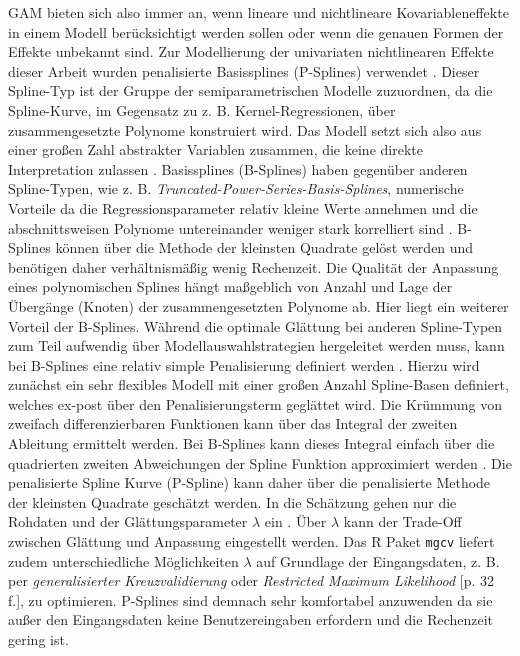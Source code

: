 \documentclass{Vorlage}
\begin{document}
GAM bieten sich also immer an, wenn lineare und nichtlineare Kovariableneffekte in einem Modell berücksichtigt werden sollen oder wenn die genauen Formen der Effekte unbekannt sind. Zur Modellierung der univariaten nichtlinearen Effekte dieser Arbeit wurden penalisierte Basissplines (P-Splines) verwendet \cite{eilers1996}. Dieser Spline-Typ ist der Gruppe der semiparametrischen Modelle zuzuordnen, da die Spline-Kurve, im Gegensatz zu z. B. Kernel-Regressionen, über zusammengesetzte Polynome konstruiert wird. Das Modell setzt sich also aus einer großen Zahl abstrakter Variablen zusammen, die keine direkte Interpretation zulassen \cite[p. 1]{eilers1996}. Basissplines (B-Splines) haben gegenüber anderen Spline-Typen, wie z. B. \textit{Truncated-Power-Series-Basis-Splines}, numerische Vorteile da die Regressionsparameter relativ kleine Werte annehmen und die abschnittsweisen Polynome untereinander weniger stark korrelliert sind \cite[p. 426]{fahrmeir2013regression}. B-Splines können über die Methode der kleinsten Quadrate gelöst werden \cite[p. 430]{fahrmeir2013regression} und benötigen daher verhältnismäßig wenig Rechenzeit. Die Qualität der Anpassung eines polynomischen Splines hängt maßgeblich von Anzahl und Lage der Übergänge (Knoten) der zusammengesetzten Polynome ab. Hier liegt ein weiterer Vorteil der B-Splines. Während die optimale Glättung bei anderen Spline-Typen zum Teil aufwendig über Modellauswahlstrategien hergeleitet werden muss, kann bei B-Splines eine relativ simple Penalisierung definiert werden \cite[p. 89 f.]{eilers1996}. Hierzu wird zunächst ein sehr flexibles Modell mit einer großen Anzahl Spline-Basen definiert, welches ex-post über den Penalisierungsterm geglättet wird. Die Krümmung von zweifach differenzierbaren Funktionen kann über das Integral der zweiten Ableitung ermittelt werden. Bei B-Splines kann dieses Integral einfach über die quadrierten zweiten Abweichungen der Spline Funktion approximiert werden \cite[p. 433]{fahrmeir2013regression}. Die penalisierte Spline Kurve (P-Spline) kann daher über die penalisierte Methode der kleinsten Quadrate geschätzt werden. In die Schätzung gehen nur die Rohdaten und der Glättungsparameter $\lambda$ ein \cite[p. 93]{eilers1996}. Über $\lambda$ kann der Trade-Off zwischen Glättung und Anpassung eingestellt werden. Das R Paket \texttt{mgcv} \cite{Wood2011} liefert zudem unterschiedliche Möglichkeiten $\lambda$ auf Grundlage der Eingangsdaten, z. B. per \textit{generalisierter Kreuzvalidierung} \cite[p. 480]{fahrmeir2013regression} oder \textit{Restricted Maximum Likelihood} \cite{wood2016}[p. 32 f.], zu optimieren. P-Splines sind demnach sehr komfortabel anzuwenden da sie außer den Eingangsdaten keine Benutzereingaben erfordern und die Rechenzeit gering ist.\\
\end{document}

